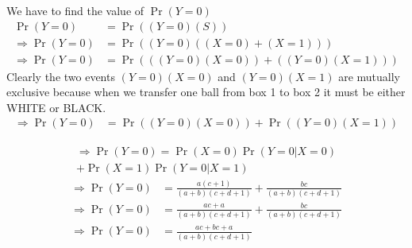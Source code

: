 \documentclass{beamer}
\providecommand{\pr}[1]{\ensuremath{\Pr\left(#1\right)}}
\begin{document}
\begin{frame}
We have to find the value of $\pr{Y=0}$ \\
\begin{align}
    \pr{Y=0} &= \pr{(Y=0)(S)} \\
   \Rightarrow \pr{Y=0} &= \pr{(Y=0)((X=0)+(X=1))} \\
    \Rightarrow \pr{Y=0} &= \pr{((Y=0)(X=0)) + ((Y=0)(X=1))} 
\end{align}
Clearly the two events $(Y=0)(X=0)$ and $(Y=0)(X=1)$ are mutually exclusive because when we transfer one ball from box 1 to box 2 it must be either WHITE or BLACK.\\
\begin{align}
    \Rightarrow \pr{Y=0} &= \pr{(Y=0)(X=0)} + \pr{(Y=0)(X=1)}
    \end{align}
\end{frame}
\begin{frame}
    \begin{multline}
    \Rightarrow \pr{Y=0} = \pr{X=0} \pr{Y=0|X=0} \\ +\pr{X=1}\pr{Y=0|X=1} 
    \end{multline}
    \begin{align}
    \Rightarrow \pr{Y=0} &= \frac{a(c+1)}{(a+b)(c+d+1)} + \frac{bc}{(a+b)(c+d+1)} \\
    \Rightarrow \pr{Y=0} &= \frac{ac+a}{(a+b)(c+d+1)} + \frac{bc}{(a+b)(c+d+1)} \\
    \Rightarrow \pr{Y=0} &= \frac{ac+bc+a}{(a+b)(c+d+1)}
\end{align}
\end{frame}
\end{document}
